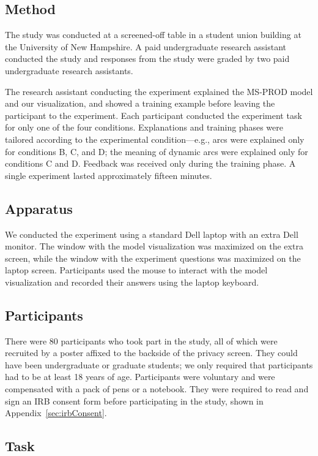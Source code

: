 \subsection{Method}

The study was conducted at a screened-off table in a student union building at the University of New Hampshire.  A paid undergraduate research assistant conducted the study and responses from the study were graded by two paid undergraduate research assistants.

The research assistant conducting the experiment explained the MS-PROD model and our visualization, and showed a training example before leaving the participant to the experiment.  Each participant conducted the experiment task for only one of the four conditions.  Explanations and training phases were tailored according to the experimental condition---e.g., arcs were explained only for conditions B, C, and D; the meaning of dynamic arcs were explained only for conditions C and D.  Feedback was received only during the training phase.  A single experiment lasted approximately fifteen minutes.

\subsection{Apparatus}

We conducted the experiment using a standard Dell laptop with an extra Dell monitor.  The window with the model visualization was maximized on the extra screen, while the window with the experiment questions was maximized on the laptop screen.  Participants used the mouse to interact with the model visualization and recorded their answers using the laptop keyboard.

\subsection{Participants}

There were 80 participants who took part in the study, all of which were recruited by a poster affixed to the backside of the privacy screen.  They could have been undergraduate or graduate students; we only required that participants had to be at least 18 years of age.  Participants were voluntary and were compensated with a pack of pens or a notebook.  They were required to read and sign an IRB consent form before participating in the study, shown in Appendix~\ref{sec:irbConsent}.

\subsection{Task}

